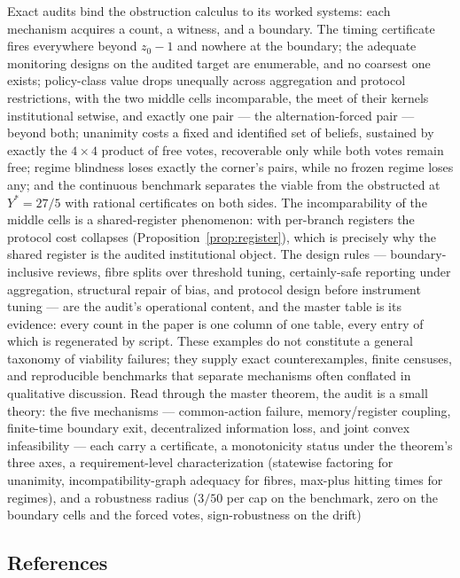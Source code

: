 \documentclass[10pt,twocolumn]{article}
\theoremstyle{definition}
\begin{document}
Exact audits bind the obstruction calculus to its worked systems: each
mechanism acquires a count, a witness, and a boundary. The timing
certificate fires everywhere beyond \(z_0 - 1\) and nowhere at the
boundary; the adequate monitoring designs on the audited target are
enumerable, and no coarsest one exists; policy-class value drops
unequally across aggregation and protocol restrictions, with the two
middle cells incomparable, the meet of their kernels institutional
setwise, and exactly one pair --- the alternation-forced pair --- beyond
both; unanimity costs a fixed and identified set of beliefs, sustained
by exactly the \(4 \times 4\) product of free votes, recoverable only
while both votes remain free; regime blindness loses exactly the
corner's pairs, while no frozen regime loses any; and the continuous
benchmark separates the viable from
the obstructed at \(Y^{*} = 27/5\) with rational certificates on both
sides. The incomparability of the middle cells is a shared-register
phenomenon: with per-branch registers the protocol cost collapses
(Proposition~\ref{prop:register}), which is precisely why the shared
register is the audited institutional object. The design rules --- boundary-inclusive reviews, fibre splits
over threshold tuning, certainly-safe reporting under aggregation,
structural repair of bias, and protocol design before instrument tuning
--- are the audit's operational content, and the master table is its
evidence: every count in the paper is one column of one table, every entry of which is regenerated by script. These examples do not constitute a general taxonomy of viability failures; they supply exact counterexamples, finite censuses, and reproducible benchmarks that separate mechanisms often conflated in qualitative discussion. Read through the master theorem, the audit is a small theory: the five mechanisms --- common-action failure, memory/register coupling, finite-time boundary exit, decentralized information loss, and joint convex infeasibility --- each carry a certificate, a monotonicity status under the theorem's three axes, a requirement-level characterization (statewise factoring for unanimity, incompatibility-graph adequacy for fibres, max-plus hitting times for regimes), and a robustness radius (\(3/50\) per cap on the benchmark, zero on the boundary cells and the forced votes, sign-robustness on the drift)

\subsection*{References}
\end{document}
